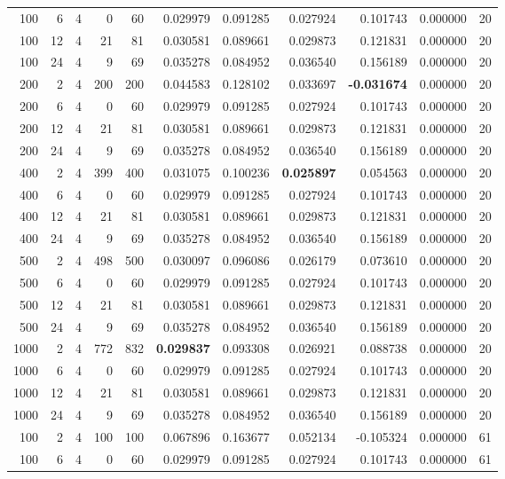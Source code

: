 \begin{table}
\begin{tabular}{rrrrrrrrrrr}
100 & 6 & 4 & 0 & 60 & 0.029979 & 0.091285 & 0.027924 & 0.101743 & 0.000000 & 20 \\
100 & 12 & 4 & 21 & 81 & 0.030581 & 0.089661 & 0.029873 & 0.121831 & 0.000000 & 20 \\
100 & 24 & 4 & 9 & 69 & 0.035278 & 0.084952 & 0.036540 & 0.156189 & 0.000000 & 20 \\
200 & 2 & 4 & 200 & 200 & 0.044583 & 0.128102 & 0.033697 & \textbf{-0.031674} & 0.000000 & 20 \\
200 & 6 & 4 & 0 & 60 & 0.029979 & 0.091285 & 0.027924 & 0.101743 & 0.000000 & 20 \\
200 & 12 & 4 & 21 & 81 & 0.030581 & 0.089661 & 0.029873 & 0.121831 & 0.000000 & 20 \\
200 & 24 & 4 & 9 & 69 & 0.035278 & 0.084952 & 0.036540 & 0.156189 & 0.000000 & 20 \\
400 & 2 & 4 & 399 & 400 & 0.031075 & 0.100236 & \textbf{0.025897} & 0.054563 & 0.000000 & 20 \\
400 & 6 & 4 & 0 & 60 & 0.029979 & 0.091285 & 0.027924 & 0.101743 & 0.000000 & 20 \\
400 & 12 & 4 & 21 & 81 & 0.030581 & 0.089661 & 0.029873 & 0.121831 & 0.000000 & 20 \\
400 & 24 & 4 & 9 & 69 & 0.035278 & 0.084952 & 0.036540 & 0.156189 & 0.000000 & 20 \\
500 & 2 & 4 & 498 & 500 & 0.030097 & 0.096086 & 0.026179 & 0.073610 & 0.000000 & 20 \\
500 & 6 & 4 & 0 & 60 & 0.029979 & 0.091285 & 0.027924 & 0.101743 & 0.000000 & 20 \\
500 & 12 & 4 & 21 & 81 & 0.030581 & 0.089661 & 0.029873 & 0.121831 & 0.000000 & 20 \\
500 & 24 & 4 & 9 & 69 & 0.035278 & 0.084952 & 0.036540 & 0.156189 & 0.000000 & 20 \\
1000 & 2 & 4 & 772 & 832 & \textbf{0.029837} & 0.093308 & 0.026921 & 0.088738 & 0.000000 & 20 \\
1000 & 6 & 4 & 0 & 60 & 0.029979 & 0.091285 & 0.027924 & 0.101743 & 0.000000 & 20 \\
1000 & 12 & 4 & 21 & 81 & 0.030581 & 0.089661 & 0.029873 & 0.121831 & 0.000000 & 20 \\
1000 & 24 & 4 & 9 & 69 & 0.035278 & 0.084952 & 0.036540 & 0.156189 & 0.000000 & 20 \\
100 & 2 & 4 & 100 & 100 & 0.067896 & 0.163677 & 0.052134 & -0.105324 & 0.000000 & 61 \\
100 & 6 & 4 & 0 & 60 & 0.029979 & 0.091285 & 0.027924 & 0.101743 & 0.000000 & 61 \\

\end{tabular}
\end{table}
